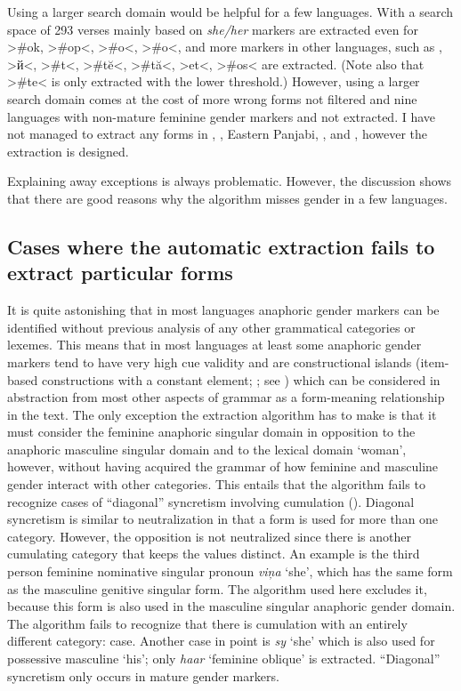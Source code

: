 \documentclass[output=collectionpaper]{langsci/langscibook}
\begin{document}
Using a larger search domain would be helpful for a few languages. With a search space of 293 verses mainly based on  \textit{she/her} markers are extracted even for  >\#ok, >\#op<,  >\#o<,  >\#o<, and more markers in other languages, such as , >й<,  >\#t<,  >\#tĕ<, >\#tă<,  >et<,  >\#os< are extracted. (Note also that  >\#te< is only extracted with the lower threshold.) However, using a larger search domain comes at the cost of more wrong forms not filtered and nine languages with non-mature feminine gender markers and  not extracted. I have not managed to extract any forms in , , Eastern Panjabi, , and , however the extraction is designed.

\largerpage
Explaining away exceptions is always problematic. However, the discussion shows that there are good reasons why the algorithm misses gender in a few languages.

\subsection{Cases where the automatic extraction fails to extract particular forms}
\label{sec:BW:3.6}

It is quite astonishing that in most languages anaphoric gender markers can be identified without previous analysis of any other grammatical categories or lexemes. This means that in most languages at least some anaphoric gender markers tend to have very high cue validity and are constructional islands (item-based constructions with a constant element; \citealt{Tomasello2003}; see ) which can be considered in abstraction from most other aspects of grammar as a form-meaning relationship in the text. The only exception the extraction algorithm has to make is that it must consider the feminine anaphoric singular domain in opposition to the anaphoric masculine singular domain and to the lexical domain ‘woman’, however, without having acquired the grammar of how feminine and masculine gender interact with other categories. This entails that the algorithm fails to recognize cases of “diagonal” syncretism involving cumulation (). Diagonal syncretism is similar to neutralization in that a form is used for more than one category. However, the opposition is not neutralized since there is another cumulating category that keeps the values distinct. An example is the  third person feminine nominative singular pronoun \textit{viņa} ‘she’, which has the same form as the masculine genitive singular form. The algorithm used here excludes it, because this form is also used in the masculine singular anaphoric gender domain. The algorithm fails to recognize that there is cumulation with an entirely different category: case. Another case in point is  \textit{sy} ‘she’ which is also used for possessive masculine ‘his’; only \textit{haar} ‘feminine oblique’ is extracted. “Diagonal” syncretism only occurs in mature gender markers.
\end{document}

